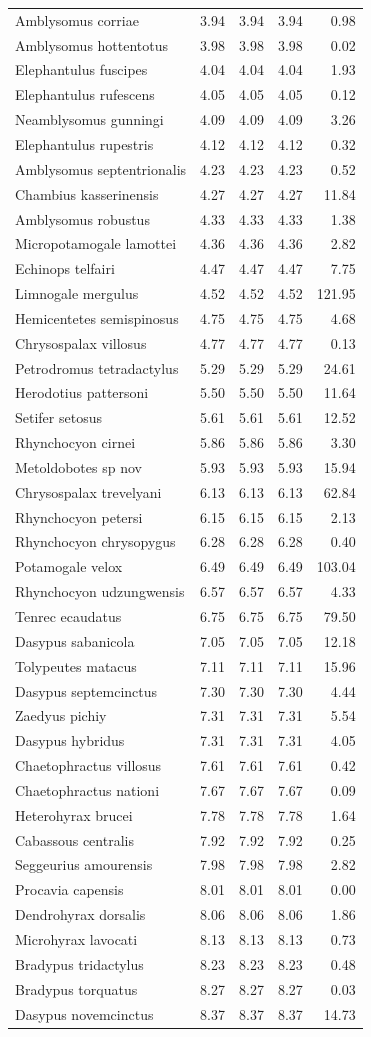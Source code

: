\documentclass[10pt,letterpaper]{article}
\begin{document}
\begin{longtable}[]{@{}lrrrr@{}}
Amblysomus corriae & 3.94 & 3.94 & 3.94 & 0.98\tabularnewline
Amblysomus hottentotus & 3.98 & 3.98 & 3.98 & 0.02\tabularnewline
Elephantulus fuscipes & 4.04 & 4.04 & 4.04 & 1.93\tabularnewline
Elephantulus rufescens & 4.05 & 4.05 & 4.05 & 0.12\tabularnewline
Neamblysomus gunningi & 4.09 & 4.09 & 4.09 & 3.26\tabularnewline
Elephantulus rupestris & 4.12 & 4.12 & 4.12 & 0.32\tabularnewline
Amblysomus septentrionalis & 4.23 & 4.23 & 4.23 & 0.52\tabularnewline
Chambius kasserinensis & 4.27 & 4.27 & 4.27 & 11.84\tabularnewline
Amblysomus robustus & 4.33 & 4.33 & 4.33 & 1.38\tabularnewline
Micropotamogale lamottei & 4.36 & 4.36 & 4.36 & 2.82\tabularnewline
Echinops telfairi & 4.47 & 4.47 & 4.47 & 7.75\tabularnewline
Limnogale mergulus & 4.52 & 4.52 & 4.52 & 121.95\tabularnewline
Hemicentetes semispinosus & 4.75 & 4.75 & 4.75 & 4.68\tabularnewline
Chrysospalax villosus & 4.77 & 4.77 & 4.77 & 0.13\tabularnewline
Petrodromus tetradactylus & 5.29 & 5.29 & 5.29 & 24.61\tabularnewline
Herodotius pattersoni & 5.50 & 5.50 & 5.50 & 11.64\tabularnewline
Setifer setosus & 5.61 & 5.61 & 5.61 & 12.52\tabularnewline
Rhynchocyon cirnei & 5.86 & 5.86 & 5.86 & 3.30\tabularnewline
Metoldobotes sp nov & 5.93 & 5.93 & 5.93 & 15.94\tabularnewline
Chrysospalax trevelyani & 6.13 & 6.13 & 6.13 & 62.84\tabularnewline
Rhynchocyon petersi & 6.15 & 6.15 & 6.15 & 2.13\tabularnewline
Rhynchocyon chrysopygus & 6.28 & 6.28 & 6.28 & 0.40\tabularnewline
Potamogale velox & 6.49 & 6.49 & 6.49 & 103.04\tabularnewline
Rhynchocyon udzungwensis & 6.57 & 6.57 & 6.57 & 4.33\tabularnewline
Tenrec ecaudatus & 6.75 & 6.75 & 6.75 & 79.50\tabularnewline
Dasypus sabanicola & 7.05 & 7.05 & 7.05 & 12.18\tabularnewline
Tolypeutes matacus & 7.11 & 7.11 & 7.11 & 15.96\tabularnewline
Dasypus septemcinctus & 7.30 & 7.30 & 7.30 & 4.44\tabularnewline
Zaedyus pichiy & 7.31 & 7.31 & 7.31 & 5.54\tabularnewline
Dasypus hybridus & 7.31 & 7.31 & 7.31 & 4.05\tabularnewline
Chaetophractus villosus & 7.61 & 7.61 & 7.61 & 0.42\tabularnewline
Chaetophractus nationi & 7.67 & 7.67 & 7.67 & 0.09\tabularnewline
Heterohyrax brucei & 7.78 & 7.78 & 7.78 & 1.64\tabularnewline
Cabassous centralis & 7.92 & 7.92 & 7.92 & 0.25\tabularnewline
Seggeurius amourensis & 7.98 & 7.98 & 7.98 & 2.82\tabularnewline
Procavia capensis & 8.01 & 8.01 & 8.01 & 0.00\tabularnewline
Dendrohyrax dorsalis & 8.06 & 8.06 & 8.06 & 1.86\tabularnewline
Microhyrax lavocati & 8.13 & 8.13 & 8.13 & 0.73\tabularnewline
Bradypus tridactylus & 8.23 & 8.23 & 8.23 & 0.48\tabularnewline
Bradypus torquatus & 8.27 & 8.27 & 8.27 & 0.03\tabularnewline
Dasypus novemcinctus & 8.37 & 8.37 & 8.37 & 14.73\tabularnewline

\end{longtable}
\end{document}
